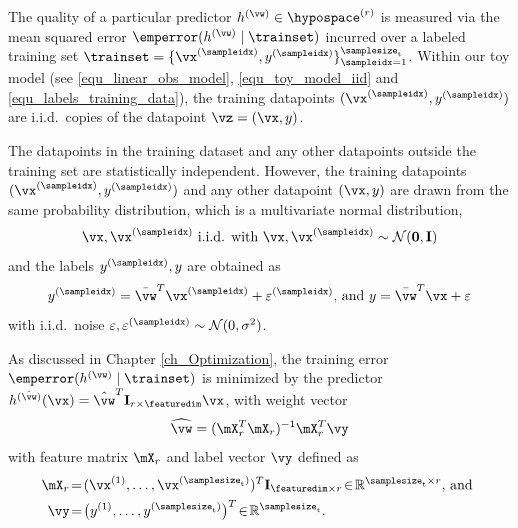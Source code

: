 \documentclass[12pt]{report}
\begin{document}
The quality of a particular predictor $h^{(\vw)} \in \hypospace^{(r)}$ is measured 
via the mean squared error $\emperror (h^{(\vw)} \mid \trainset)$ incurred over a 
labeled training set $\trainset= \{ \vx^{(\sampleidx)}, y^{(\sampleidx)} \}_{\sampleidx=1}^{\samplesize_{\rm t}}$. 
Within our toy model (see \eqref{equ_linear_obs_model}, \eqref{equ_toy_model_iid} 
and \eqref{equ_labels_training_data}), the training datapoints $(\vx^{(\sampleidx)},y^{(\sampleidx)})$ 
are i.i.d.\ copies of the datapoint $\vz = (\vx,y)$. 

The datapoints in the training dataset and any other datapoints outside the 
training set are statistically independent. However, the training datapoints 
$(\vx^{(\sampleidx)},y^{(\sampleidx)})$ and any other datapoint $(\vx,y)$ are 
drawn from  the same probability distribution, which is a multivariate normal distribution, 
\begin{equation} 
\label{equ_toy_model_iid}
\vx, \vx^{(\sampleidx)} \mbox{ i.i.d. with } \vx, \vx^{(\sampleidx)} \sim \mathcal{N}(\mathbf{0}, \mathbf{I}) 
\end{equation} 
and the labels $y^{(\sampleidx)},y$ are obtained as 
\begin{equation} 
\label{equ_labels_training_data}
y^{(\sampleidx)} = \bar{\vw}^{T}  \vx^{(\sampleidx)} + \varepsilon^{(\sampleidx)}\mbox{, and } y = \bar{\vw}^{T}  \vx + \varepsilon
\end{equation}  
with i.i.d.\ noise $\varepsilon, \varepsilon^{(\sampleidx)} \sim \mathcal{N}(0,\sigma^{2})$. 

As discussed in Chapter \ref{ch_Optimization}, the training error $\emperror (h^{(\vw)} \mid \trainset)$ 
is minimized by the predictor $h^{(\hat{\vw})}(\vx) =  \hat{\vw}^{T} \mathbf{I}_{r \times \featuredim} \vx$, 
with weight vector 
\begin{equation}
\label{equ_optimal_weight_closed_form}
\widehat{\vw} =  (\mX^{T}_{r} \mX_{r})^{-1} \mX_{r}^{T} \vy
\end{equation} 
with feature matrix $\mX_{r}$ and label vector $\vy$ defined as 
\begin{align}
\label{equ_def_feature_matrix_r}
\mX_{r}& \!=\!(\vx^{(1)},\ldots,\vx^{(\samplesize_{\rm t})})^{T} \mathbf{I}_{\featuredim \times r}\!\in\!\mathbb{R}^{\samplesize_{\rm t} \times r} \mbox{, and }  \nonumber \\
\vy& \!=\!\big(y^{(1)},\ldots,y^{(\samplesize_{\rm t})}\big)^{T}\!\in\!\mathbb{R}^{\samplesize_{\rm t}}.
\end{align} 
\end{document}
